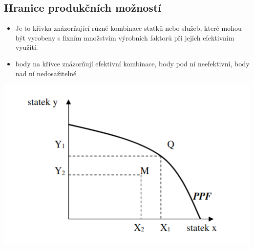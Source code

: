 \subsection{Hranice produkčních možností}
\begin{itemize}
    \item Je to křivka znázorňující různé kombinace statků nebo služeb, které mohou být vyrobeny s fixním množstvím výrobních faktorů při jejich efektivním využití.
    \item body na křivce znázorňují efektivní kombinace, body pod ní neefektivní, body nad ní nedosažitelné
\end{itemize}
\includegraphics[width=16cm]{images/02_hranice_vyrobnich_moznosti.png}